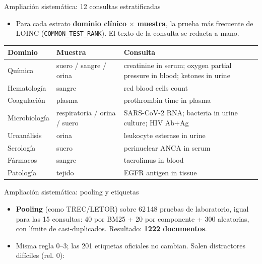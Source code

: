 \documentclass[aspectratio=169,11pt]{beamer}
\newcommand{\code}[1]{\texttt{#1}}
\begin{document}
\begin{frame}{Ampliación sistemática: 12 consultas estratificadas}
  \begin{itemize}\small
    \item Para cada estrato \textbf{dominio clínico $\times$ muestra}, la prueba más frecuente de LOINC (\code{COMMON\_TEST\_RANK}).
      El texto de la consulta se redacta a mano.
  \end{itemize}
  \centering\scriptsize
  \begin{tabular}{lll}
    \toprule
    Dominio & Muestra & Consulta \\
    \midrule
    Química & suero / sangre / orina & creatinine in serum; oxygen partial pressure in blood; ketones in urine \\
    Hematología & sangre & red blood cells count \\
    Coagulación & plasma & prothrombin time in plasma \\
    Microbiología & respiratoria / orina / suero & SARS-CoV-2 RNA; bacteria in urine culture; HIV Ab+Ag \\
    Uroanálisis & orina & leukocyte esterase in urine \\
    Serología & suero & perinuclear ANCA in serum \\
    Fármacos & sangre & tacrolimus in blood \\
    Patología & tejido & EGFR antigen in tissue \\
    \bottomrule
  \end{tabular}
\end{frame}

\begin{frame}{Ampliación sistemática: pooling y etiquetas}
  \begin{itemize}\small
    \item \textbf{Pooling} (como TREC/LETOR) sobre 62\,148 pruebas de laboratorio, igual para las 15 consultas:
      40 por BM25 + 20 por componente + 300 aleatorias, con límite de casi-duplicados. Resultado: \textbf{1222 documentos}.
    \item Misma regla 0--3; las 201 etiquetas oficiales no cambian. Salen distractores difíciles (rel. 0):
  \end{itemize}
  \centering\tiny
  \resizebox{!}{0.55\textheight}{}
\end{frame}
\end{document}
